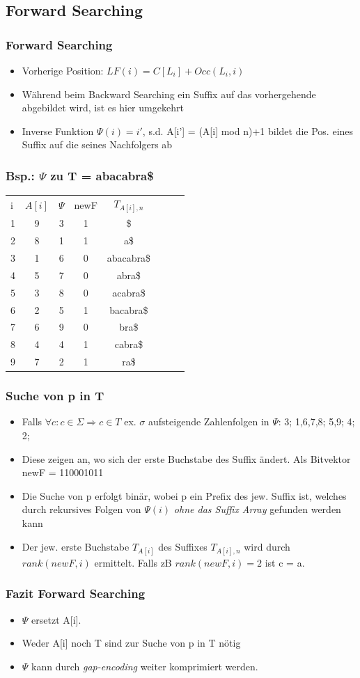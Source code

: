 \documentclass{beamer}
\begin{document}
\begin{frame}
\subsection{Forward Searching}
\frametitle{Forward Searching}
\begin{itemize}
\item Vorherige Position: $LF(i) = C[L_i] + Occ(L_i,i)$
\item Während beim Backward Searching ein Suffix auf das vorhergehende abgebildet wird, ist es hier umgekehrt
\item Inverse Funktion $\Psi(i) = i'$, s.d. A[i'] = (A[i] mod n)+1 bildet die Pos. eines Suffix auf die seines Nachfolgers ab
\end{itemize}
\end{frame}
\begin{frame}
\frametitle{Bsp.: $\Psi$ zu T = \glqq abacabra\$\grqq}
\begin{tabular}{l c cc ccc r}
i & $A[i]$ & $\Psi$ & newF & $T_{A[i],n}$ \\
1 & 9 & 3 & 1 &\$\\
2 & 8 & 1 & 1&a\$\\
3 & 1 & 6 & 0&abacabra\$\\
4 & 5 & 7 & 0&abra\$\\
5 & 3 & 8 & 0&acabra\$\\
6 & 2 & 5 & 1&bacabra\$\\
7 & 6 & 9 & 0&bra\$\\
8 & 4 & 4 & 1&cabra\$\\
9 & 7 & 2 & 1&ra\$\\
\end{tabular}
\end{frame}
\begin{frame}
\frametitle{Suche von p in T}
\begin{itemize}
\item Falls $\forall c: c \in \Sigma \Rightarrow c \in T$ ex. $\sigma$ aufsteigende Zahlenfolgen in $\Psi$: 3; 1,6,7,8; 5,9; 4; 2;
\item Diese zeigen an, wo sich der erste Buchstabe des Suffix ändert. Als Bitvektor newF = 110001011
\item Die Suche von p erfolgt binär, wobei p ein Prefix des jew. Suffix ist, welches durch rekursives Folgen von $\Psi(i)$ \textit{ohne das Suffix Array} gefunden werden kann
\item Der jew. erste Buchstabe $T_{A[i]}$ des Suffixes $T_{A[i],n}$ wird durch $rank(newF,i)$ ermittelt. Falls zB $rank(newF,i) = 2$ ist c = \glqq a\grqq.
\end{itemize}
\end{frame}
\begin{frame}
\frametitle{Fazit Forward Searching}
\begin{itemize}
\item $\Psi$ ersetzt A[i].
\item Weder A[i] noch T sind zur Suche von p in T nötig
\item $\Psi$ kann durch \textit{gap-encoding} weiter komprimiert werden.
\end{itemize}
\end{frame}
\end{document}

